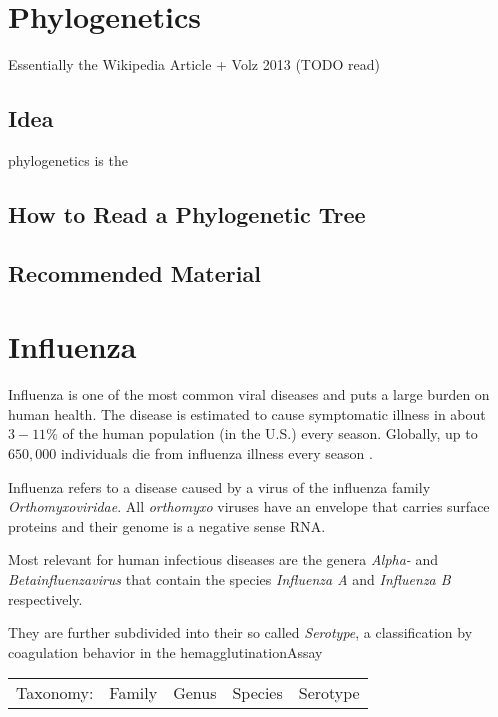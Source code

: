 \documentclass[12pt]{scrartcl}
\begin{document}
\section{Phylogenetics}

  

  Essentially the Wikipedia Article + Volz 2013 (TODO read)

  \subsection{Idea}

  \Gls{phylogenetics} is the

  \subsection{How to Read a Phylogenetic Tree}

  \subsection{Recommended Material}




\section{Influenza}

  Influenza is one of the most common viral diseases \citep{DudaMenna20} and puts a large burden on human health. The disease is estimated to cause symptomatic illness in about $3 - 11 \%$ of the human population (in the U.S.) \citep{tokarsOlsen+18} every season. Globally, up to $650,000$ individuals die from influenza illness every season \cite[see][]{iulianoRoguski+18}.

  Influenza refers to a disease caused by a virus of the influenza family \textit{Orthomyxoviridae}. All \textit{orthomyxo} viruses have an envelope that carries surface proteins and their genome is a negative sense RNA.

  Most relevant for human infectious diseases are the genera \textit{Alpha-} and \textit{Betainfluenzavirus} that contain the species \textit{Influenza A} and \textit{Influenza B} respectively.

  They are further subdivided into their so called \textit{Serotype}, a classification by coagulation behavior in the \gls{hemagglutinationAssay}\\[0mm]


  \begin{tabular}{ c c c c c }

   Taxonomy: & \hspace{18mm}Family\hspace{13mm} & Genus\hspace{3mm} & Species\hspace{10mm} & Serotype\hspace{1mm}\\
    
  \end{tabular}\\[0mm]
\end{document}
